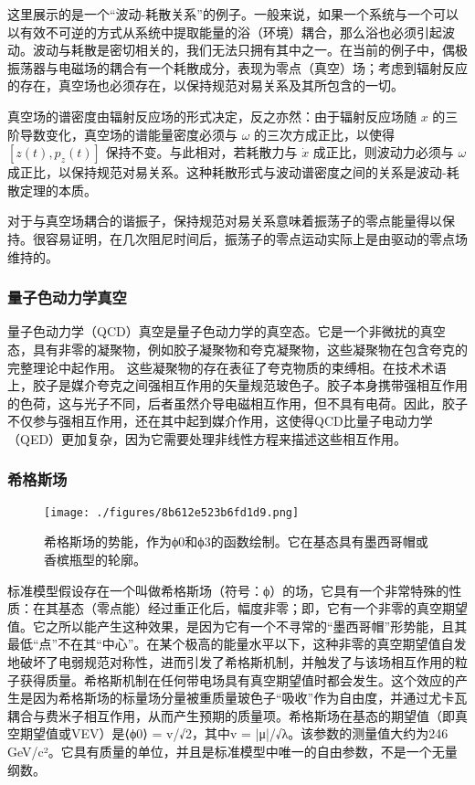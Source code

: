 这里展示的是一个“波动-耗散关系”的例子。一般来说，如果一个系统与一个可以以有效不可逆的方式从系统中提取能量的浴（环境）耦合，那么浴也必须引起波动。波动与耗散是密切相关的，我们无法只拥有其中之一。在当前的例子中，偶极振荡器与电磁场的耦合有一个耗散成分，表现为零点（真空）场；考虑到辐射反应的存在，真空场也必须存在，以保持规范对易关系及其所包含的一切。

真空场的谱密度由辐射反应场的形式决定，反之亦然：由于辐射反应场随 \( x \) 的三阶导数变化，真空场的谱能量密度必须与 \( \omega \) 的三次方成正比，以使得 \( [z(t), p_z(t)] \) 保持不变。与此相对，若耗散力与 \( \dot{x} \) 成正比，则波动力必须与 \( \omega \) 成正比，以保持规范对易关系。这种耗散形式与波动谱密度之间的关系是波动-耗散定理的本质。

对于与真空场耦合的谐振子，保持规范对易关系意味着振荡子的零点能量得以保持。很容易证明，在几次阻尼时间后，振荡子的零点运动实际上是由驱动的零点场维持的。
\subsubsection{量子色动力学真空}
量子色动力学（QCD）真空是量子色动力学的真空态。它是一个非微扰的真空态，具有非零的凝聚物，例如胶子凝聚物和夸克凝聚物，这些凝聚物在包含夸克的完整理论中起作用。 这些凝聚物的存在表征了夸克物质的束缚相。在技术术语上，胶子是媒介夸克之间强相互作用的矢量规范玻色子。胶子本身携带强相互作用的色荷，这与光子不同，后者虽然介导电磁相互作用，但不具有电荷。因此，胶子不仅参与强相互作用，还在其中起到媒介作用，这使得QCD比量子电动力学（QED）更加复杂，因为它需要处理非线性方程来描述这些相互作用。
\subsubsection{希格斯场}
\begin{figure}[ht]
\centering
\texttt{[image: ./figures/8b612e523b6fd1d9.png]}
\caption{希格斯场的势能，作为ϕ0和ϕ3的函数绘制。它在基态具有墨西哥帽或香槟瓶型的轮廓。} \label{fig_LD_11}
\end{figure}
标准模型假设存在一个叫做希格斯场（符号：ϕ）的场，它具有一个非常特殊的性质：在其基态（零点能）经过重正化后，幅度非零；即，它有一个非零的真空期望值。它之所以能产生这种效果，是因为它有一个不寻常的“墨西哥帽”形势能，且其最低“点”不在其“中心”。在某个极高的能量水平以下，这种非零的真空期望值自发地破坏了电弱规范对称性，进而引发了希格斯机制，并触发了与该场相互作用的粒子获得质量。希格斯机制在任何带电场具有真空期望值时都会发生。这个效应的产生是因为希格斯场的标量场分量被重质量玻色子“吸收”作为自由度，并通过尤卡瓦耦合与费米子相互作用，从而产生预期的质量项。希格斯场在基态的期望值（即真空期望值或VEV）是⟨ϕ0⟩ = v/√2，其中v = |μ|/√λ。该参数的测量值大约为246 GeV/c²。它具有质量的单位，并且是标准模型中唯一的自由参数，不是一个无量纲数。

